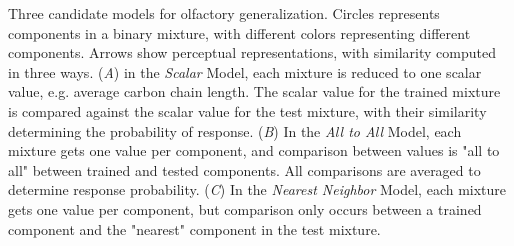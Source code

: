 \label{fig:cartoon}
Three candidate models for olfactory generalization.  Circles represents components in a binary mixture, with different colors representing different components.  Arrows show perceptual representations, with similarity computed in three ways. (\textit{A}) in the \textit{Scalar} Model, each mixture is reduced to one scalar value, e.g. average carbon chain length.  The scalar value for the trained mixture is compared against the scalar value for the test mixture, with their similarity determining the probability of response. (\textit{B}) In the \textit{All to All} Model, each mixture gets one value per component, and comparison between values is "all to all" between trained and tested components.  All comparisons are averaged to determine response probability. (\textit{C}) In the \textit{Nearest Neighbor} Model, each mixture gets one value per component, but comparison only occurs between a trained component and the "nearest" component in the test mixture.  